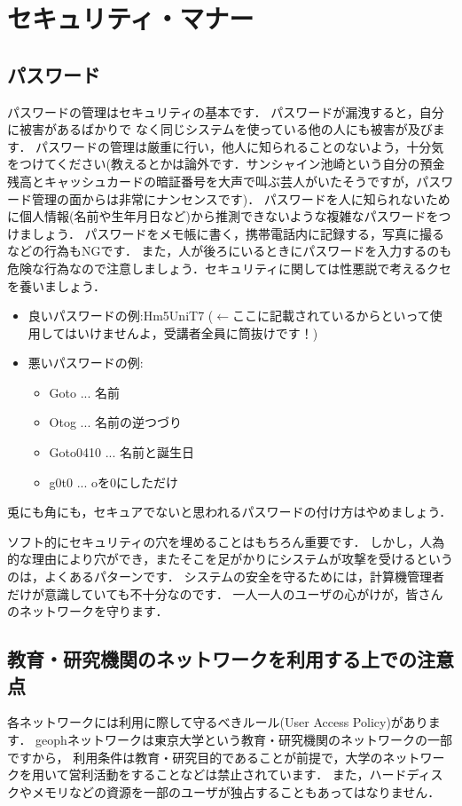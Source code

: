 \documentclass{jarticle}
\begin{document}
\section{セキュリティ・マナー}
\subsection{パスワード}
パスワードの管理はセキュリティの基本です．
パスワードが漏洩すると，自分に被害があるばかりで なく同じシステムを使っている他の人にも被害が及びます．
パスワードの管理は厳重に行い，他人に知られることのないよう，十分気をつけてください(教えるとかは論外です．サンシャイン池崎という自分の預金残高とキャッシュカードの暗証番号を大声で叫ぶ芸人がいたそうですが，パスワード管理の面からは非常にナンセンスです)．
パスワードを人に知られないために個人情報(名前や生年月日など)から推測できないような複雑なパスワードをつけましょう．
パスワードをメモ帳に書く，携帯電話内に記録する，写真に撮るなどの行為もNGです．
また，人が後ろにいるときにパスワードを入力するのも危険な行為なので注意しましょう．セキュリティに関しては性悪説で考えるクセを養いましょう．
\begin{itemize}
\item 良いパスワードの例:Hm5UniT7 ($\leftarrow$ここに記載されているからといって使用してはいけませんよ，受講者全員に筒抜けです！)
\item 悪いパスワードの例:
	\begin{itemize}
	\item Goto ... 名前
	\item Otog ... 名前の逆つづり
	\item Goto0410 ... 名前と誕生日
	\item g0t0 ... oを0にしただけ
	\end{itemize}
\end{itemize}

兎にも角にも，セキュアでないと思われるパスワードの付け方はやめましょう．

ソフト的にセキュリティの穴を埋めることはもちろん重要です．
しかし，人為的な理由により穴ができ，またそこを足がかりにシステムが攻撃を受けるというのは，よくあるパターンです．
システムの安全を守るためには，計算機管理者だけが意識していても不十分なのです．
一人一人のユーザの心がけが，皆さんのネットワークを守ります．

\subsection{教育・研究機関のネットワークを利用する上での注意点}
各ネットワークには利用に際して守るべきルール(User Access Policy)があります．
geophネットワークは東京大学という教育・研究機関のネットワークの一部ですから，
利用条件は教育・研究目的であることが前提で，大学のネットワークを用いて営利活動をすることなどは禁止されています．
また，ハードディスクやメモリなどの資源を一部のユーザが独占することもあってはなりません．
 
\end{document}
